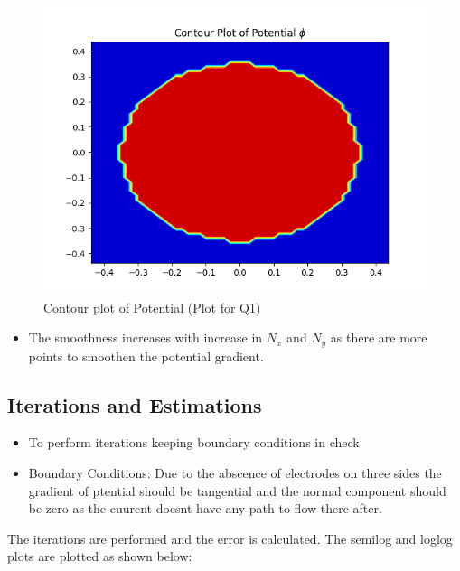\documentclass[11pt, a4paper]{article}
\begin{document}
            \begin{figure}[H]
                \centering
                \includegraphics[scale=0.9]{Fig1.png}
                \caption{Contour plot of Potential (Plot for Q1)}                
            \end{figure}
            
	\begin{itemize}
	\item
	 The smoothness increases with increase in \(N_x\) and \(N_y\) as there are more points to smoothen the potential gradient.
       \end{itemize}
	  \subsection{Iterations and Estimations}
	\begin{itemize}
	\item
	 To perform iterations keeping boundary conditions in check
	 \item
	 Boundary Conditions: Due to the abscence of electrodes on three sides the gradient of ptential should be tangential and the normal component should be zero as the cuurent doesnt have any path to flow there after.
	  
       \end{itemize}
        The iterations are performed and the error is calculated. The semilog and loglog plots are plotted as shown below:
         
\end{document}
